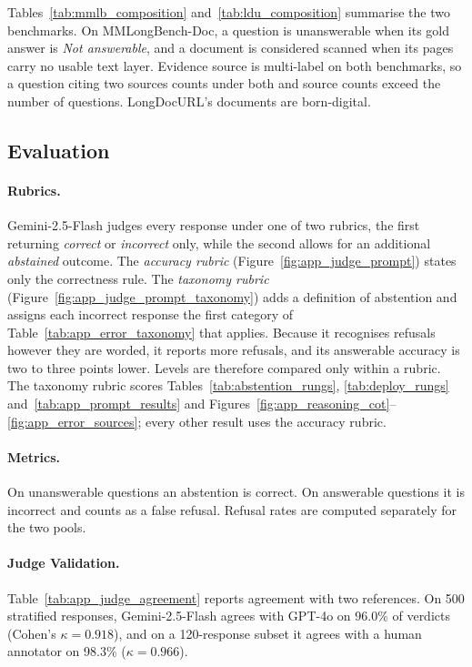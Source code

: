 


Tables~\ref{tab:mmlb_composition} and~\ref{tab:ldu_composition} summarise the two benchmarks. On MMLongBench-Doc, a question is unanswerable when its gold answer is \emph{Not answerable}, and a document is considered scanned when its pages carry no usable text layer. Evidence source is multi-label on both benchmarks, so a question citing two sources counts under both and source counts exceed the number of questions. LongDocURL's documents are born-digital.

\subsection{Evaluation}
\label{app:evaluation}






\paragraph{Rubrics.}
Gemini-2.5-Flash judges every response under one of two rubrics, the first returning \emph{correct} or \emph{incorrect} only, while the second allows for an additional \emph{abstained} outcome. The \emph{accuracy rubric} (Figure~\ref{fig:app_judge_prompt}) states only the correctness rule. The \emph{taxonomy rubric} (Figure~\ref{fig:app_judge_prompt_taxonomy}) adds a definition of abstention and assigns each incorrect response the first category of Table~\ref{tab:app_error_taxonomy} that applies. Because it recognises refusals however they are worded, it reports more refusals, and its answerable accuracy is two to three points lower. Levels are therefore compared only within a rubric. The taxonomy rubric scores Tables~\ref{tab:abstention_rungs}, \ref{tab:deploy_rungs} and~\ref{tab:app_prompt_results} and Figures~\ref{fig:app_reasoning_cot}--\ref{fig:app_error_sources}; every other result uses the accuracy rubric.

\paragraph{Metrics.}
On unanswerable questions an abstention is correct. On answerable questions it is incorrect and counts as a false refusal. Refusal rates are computed separately for the two pools.

\paragraph{Judge Validation.}
Table~\ref{tab:app_judge_agreement} reports agreement with two references. On 500 stratified responses, Gemini-2.5-Flash agrees with GPT-4o on 96.0\% of verdicts (Cohen's $\kappa = 0.918$), and on a 120-response subset it agrees with a human annotator on 98.3\% ($\kappa = 0.966$).